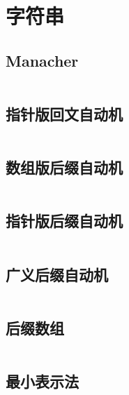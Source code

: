 \chapter{字符串}
\section{Manacher}
\inputminted{cpp}{\source/string/manacher.cpp}
\section{指针版回文自动机}
\inputminted{cpp}{\source/string/PalindromeAutomaton_pointer.cpp}
\section{数组版后缀自动机}
\inputminted{cpp}{\source/string/SuffixAutomaton_array.cpp}
\section{指针版后缀自动机}
\inputminted{cpp}{\source/string/SuffixAutomaton_pointer.cpp}
\section{广义后缀自动机}
\inputminted{cpp}{\source/string/EX_SuffixAutomaton_pointer.cpp}
\section{后缀数组}
\inputminted{cpp}{\source/string/SA.cpp}
\section{最小表示法}
\inputminted{cpp}{\source/string/min_express.cpp}